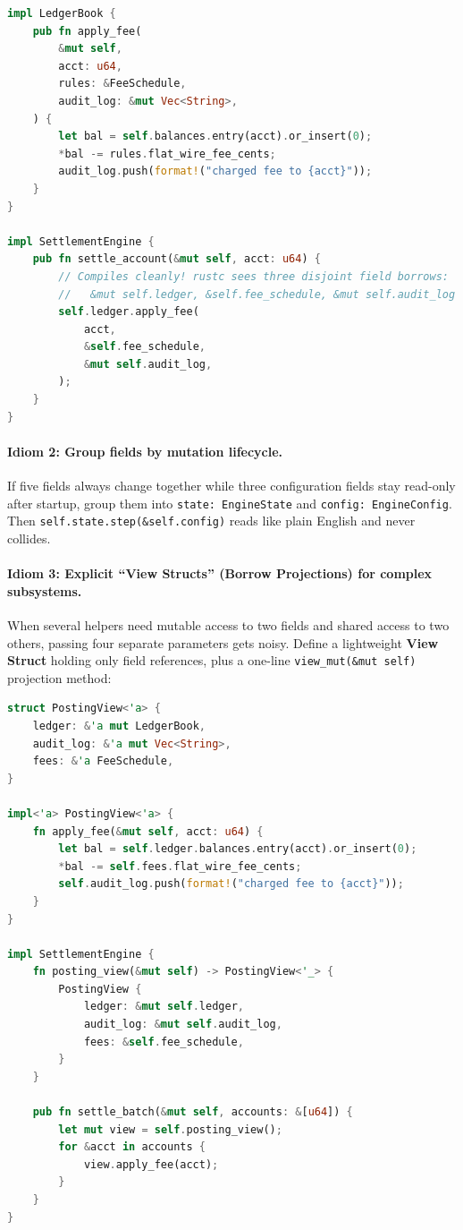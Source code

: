 \begin{lstlisting}[language=Rust]
impl LedgerBook {
    pub fn apply_fee(
        &mut self,
        acct: u64,
        rules: &FeeSchedule,
        audit_log: &mut Vec<String>,
    ) {
        let bal = self.balances.entry(acct).or_insert(0);
        *bal -= rules.flat_wire_fee_cents;
        audit_log.push(format!("charged fee to {acct}"));
    }
}

impl SettlementEngine {
    pub fn settle_account(&mut self, acct: u64) {
        // Compiles cleanly! rustc sees three disjoint field borrows:
        //   &mut self.ledger, &self.fee_schedule, &mut self.audit_log
        self.ledger.apply_fee(
            acct,
            &self.fee_schedule,
            &mut self.audit_log,
        );
    }
}
\end{lstlisting}

\paragraph{Idiom 2: Group fields by mutation lifecycle.}
If five fields always change together while three configuration fields stay read-only after startup, group them into \texttt{state: EngineState} and \texttt{config: EngineConfig}. Then \texttt{self.state.step(\&self.config)} reads like plain English and never collides.

\paragraph{Idiom 3: Explicit ``View Structs'' (Borrow Projections) for complex subsystems.}
When several helpers need mutable access to two fields and shared access to two others, passing four separate parameters gets noisy. Define a lightweight \textbf{View Struct} holding only field references, plus a one-line \texttt{view\_mut(\&mut self)} projection method:

\begin{lstlisting}[language=Rust]
struct PostingView<'a> {
    ledger: &'a mut LedgerBook,
    audit_log: &'a mut Vec<String>,
    fees: &'a FeeSchedule,
}

impl<'a> PostingView<'a> {
    fn apply_fee(&mut self, acct: u64) {
        let bal = self.ledger.balances.entry(acct).or_insert(0);
        *bal -= self.fees.flat_wire_fee_cents;
        self.audit_log.push(format!("charged fee to {acct}"));
    }
}

impl SettlementEngine {
    fn posting_view(&mut self) -> PostingView<'_> {
        PostingView {
            ledger: &mut self.ledger,
            audit_log: &mut self.audit_log,
            fees: &self.fee_schedule,
        }
    }

    pub fn settle_batch(&mut self, accounts: &[u64]) {
        let mut view = self.posting_view();
        for &acct in accounts {
            view.apply_fee(acct);
        }
    }
}
\end{lstlisting}

